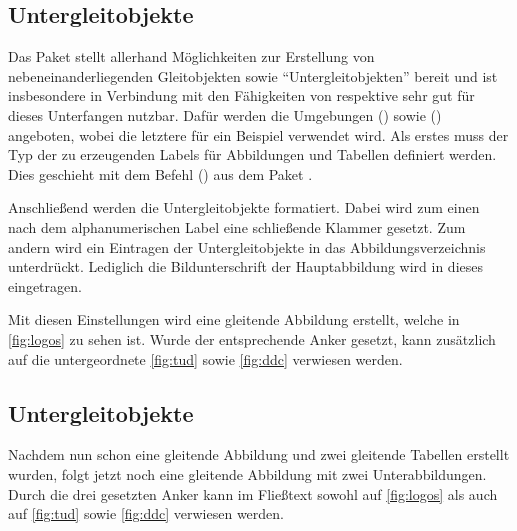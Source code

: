 \documentclass[%
  english,ngerman,%
  cdgeometry=no,DIV=12,automark,%
]{tudscrartcl}
\begin{document}
\begin{table}
\end{table}


\subsection{Untergleitobjekte}
\label{sec:subfloats}%
%
Das Paket  stellt allerhand Möglichkeiten zur Erstellung von 
nebeneinanderliegenden Gleitobjekten sowie \enquote{Untergleitobjekten} bereit 
und ist insbesondere in Verbindung mit den Fähigkeiten von  
respektive  sehr gut für dieses Unterfangen nutzbar. Dafür 
werden die Umgebungen () sowie 
() angeboten, wobei die letztere für 
ein Beispiel verwendet wird. Als erstes muss der Typ der zu erzeugenden Labels 
für Abbildungen und Tabellen definiert werden. Dies geschieht mit dem Befehl 
() aus dem Paket 
.
%
\begin{Preamble}
\end{Preamble}
%
Anschließend werden die Untergleitobjekte formatiert. Dabei wird zum einen nach 
dem alphanumerischen Label eine schließende Klammer gesetzt. Zum andern wird 
ein Eintragen der Untergleitobjekte in das Abbildungsverzeichnis unterdrückt. 
Lediglich die Bildunterschrift der Hauptabbildung wird in dieses eingetragen.
%
\begin{Preamble*}
\captionsetup[subfloat]{labelformat=brace,list=off}

\end{Preamble*}
%
Mit diesen Einstellungen wird eine gleitende Abbildung erstellt, welche in 
\autoref{fig:logos} zu sehen ist. Wurde der entsprechende Anker gesetzt, kann 
zusätzlich auf die untergeordnete \autoref{fig:tud} sowie \autoref{fig:ddc} 
verwiesen werden.
%
\begin{Trunk+}
\subsection{Untergleitobjekte}
Nachdem nun schon eine gleitende Abbildung und zwei gleitende Tabellen 
erstellt wurden, folgt jetzt noch eine gleitende Abbildung mit zwei 
Unterabbildungen. Durch die drei gesetzten Anker kann im Fließtext 
sowohl auf \autoref{fig:logos} als auch auf \autoref{fig:tud} sowie 
\autoref{fig:ddc} verwiesen werden.

\end{Trunk+}
\end{document}
